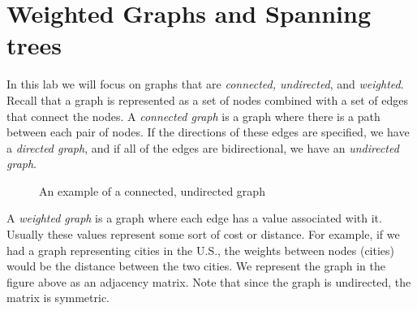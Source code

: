 
\label{Ch:Kruskal}


\section*{Weighted Graphs and Spanning trees}

In this lab we will focus on graphs that are \emph{connected, undirected}, and \emph{weighted}. Recall that a graph is represented as a set of nodes combined with a set of edges that connect the nodes. A \emph{connected graph} is a graph where there is a path between each pair of nodes. If the directions of these edges are specified, we have a \emph{directed graph}, and if all of the edges are bidirectional, we have an \emph{undirected graph}.

\begin{figure}[h]
\caption{An example of a connected, undirected graph}
\label{mst:graph1}
\end{figure}

A \emph{weighted graph} is a graph where each edge has a value associated with it.
Usually these values represent some sort of cost or distance. For example, if we had a graph representing cities in the U.S., the weights between nodes (cities) would be the distance between the two cities. We represent the graph in the figure above as an adjacency matrix. Note that since the graph is undirected, the matrix is symmetric.

